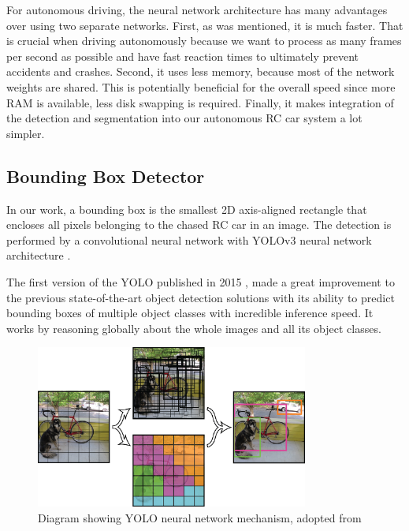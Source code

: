 \documentclass{ctuthesis/ctuthesis}
\begin{document}
For autonomous driving, the neural network architecture has many advantages over using two separate networks. First, as was mentioned, it is much faster. That is crucial when driving autonomously because we want to process as many frames per second as possible and have fast reaction times to ultimately prevent accidents and crashes. Second, it uses less memory, because most of the network weights are shared. This is potentially beneficial for the overall speed since more RAM is available, less disk swapping is required. Finally, it makes integration of the detection and segmentation into our autonomous RC car system a lot simpler.




\subsection{Bounding Box Detector}
In our work, a bounding box is the smallest 2D axis-aligned rectangle that encloses all pixels belonging to the chased RC car in an image. The detection is performed by a convolutional neural network \cite{CNN_Lecun} with YOLOv3 neural network architecture \cite{YOLOv3}. \par 
The first version of the YOLO published in 2015 \cite{YOLO}, made a great improvement to the previous state-of-the-art object detection solutions with its ability to predict bounding boxes of multiple object classes with incredible inference speed. It works by reasoning globally about the whole images and all its object classes. \par


\begin{figure}[h!]
    \centering
    \includegraphics[width=0.8\textwidth]{images/YOLO.png}
    
    \caption{Diagram showing YOLO neural network mechanism, adopted from \protect\cite{YOLO}}\label{f:YOLO}
\end{figure}
\end{document}
